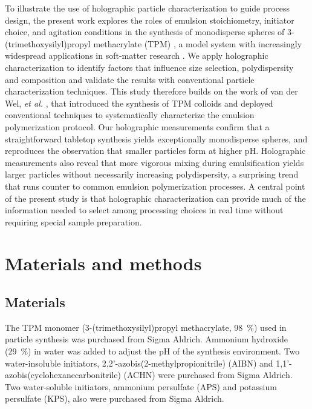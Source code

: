 \documentclass[journal=langd5,manuscript=article]{achemso}
\begin{document}
To illustrate the use of holographic particle characterization
to guide process design, the present work
explores the roles of emulsion stoichiometry, initiator choice, and
agitation conditions in the synthesis of monodisperse spheres of
3-(trimethoxysilyl)propyl methacrylate (TPM) \cite{vanderwel17},
a model system with increasingly widespread applications
in soft-matter research \cite{sacanna11,liu16,vanderwel18}.
We apply holographic characterization
to identify factors that influence size selection, polydispersity
and composition and validate the results with conventional particle
characterization techniques.
This study therefore builds on the work of van der Wel, \emph{et al.}
\cite{vanderwel17}, that introduced the synthesis of TPM colloids
and deployed conventional techniques to systematically
characterize the emulsion polymerization protocol.
Our holographic measurements confirm that a straightforward
tabletop synthesis yields exceptionally monodisperse spheres,
and reproduces the observation \cite{vanderwel17}
that smaller particles form at higher pH.
Holographic measurements also reveal that more vigorous
mixing during emulsification yields larger
particles without necessarily increasing polydispersity,
a surprising trend that runs counter to common
emulsion polymerization processes.
A central point of the present study is that holographic
characterization can provide much of the information
needed to select among processing choices in real time
without requiring special sample preparation.

\section{Materials and methods}
\label{sec:experimental}

\subsection{Materials}
\label{sec:materials}
The TPM monomer (3-(trimethoxysilyl)propyl methacrylate, \SI{98}{\percent})
used in particle synthesis was purchased from Sigma Aldrich. 
Ammonium hydroxide (\SI{29}{\percent}) in water was added to adjust
the pH of the synthesis environment.
Two water-insoluble initiators, 2,2'-azobis(2-methylpropionitrile) (AIBN)
and 1,1'-azobis(cyclohexanecarbonitrile) (ACHN)
were purchased from Sigma Aldrich.
Two water-soluble initiators, 
ammonium persulfate (APS) and potassium persulfate (KPS),
also were purchased from Sigma Aldrich.
\end{document}
